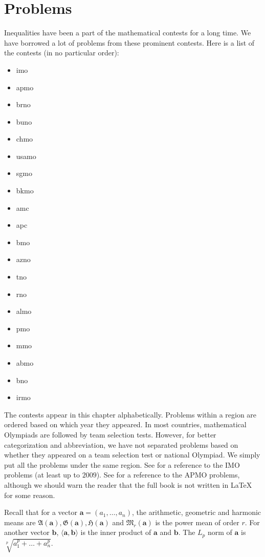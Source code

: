 \documentclass{subfile}
\begin{document}
	\chapter{Problems}\label{ch:problems}
	Inequalities have been a part of the mathematical contests for a long time. We have borrowed a lot of problems from these prominent contests. Here is a list of the contests (in no particular order):
		\begin{itemize}
			\item \Gls{imo}
			\item \Gls{apmo}
			\item \Gls{brno}
			\item \Gls{buno}
			\item \Gls{chmo}
			\item \Gls{usamo}
			\item \Gls{sgmo}
			\item \Gls{bkmo}
			\item \Gls{amc}
			\item \Gls{apc}
			\item \Gls{bmo}
			\item \Gls{azno}
			\item \Gls{tno}
			\item \Gls{rno}
			\item \Gls{almo}
			\item \Gls{pmo}
			\item \Gls{mmo}
			\item \Gls{abmo}
			\item \Gls{bno}
			\item \Gls{irmo}
		\end{itemize}
	The contests appear in this chapter alphabetically. Problems within a region are ordered based on which year they appeared. In most countries, mathematical Olympiads are followed by team selection tests. However, for better categorization and abbreviation, we have not separated problems based on whether they appeared on a team selection test or national Olympiad. We simply put all the problems under the same region. See \textcite{djukicc_jankovic_matic_2011} for a reference to the IMO problems (at least up to $2009$). See \textcite{dongphd_suugaku_2009} for a reference to the APMO problems, although we should warn the reader that the full book is not written in \LaTeX{} for some reason.
	
	Recall that for a vector $\mathbf{a}=(a_{1},\ldots,a_{n})$, the arithmetic, geometric and harmonic means are $\mathfrak{A}(\mathbf{a}),\mathfrak{G}(\mathbf{a}),\mathfrak{H}(\mathbf{a})$ and $\mathfrak{M}_r(\mathbf{a})$ is the power mean of order $r$. For another vector $\mathbf{b}$, $\langle\mathbf{a},\mathbf{b}\rangle$ is the inner product of $\mathbf{a}$ and $\mathbf{b}$. The $L_{p}$ norm of $\mathbf{a}$ is $\sqrt[p]{a_{1}^{p}+\ldots+a_{n}^{p}}$.
	
\end{document}
